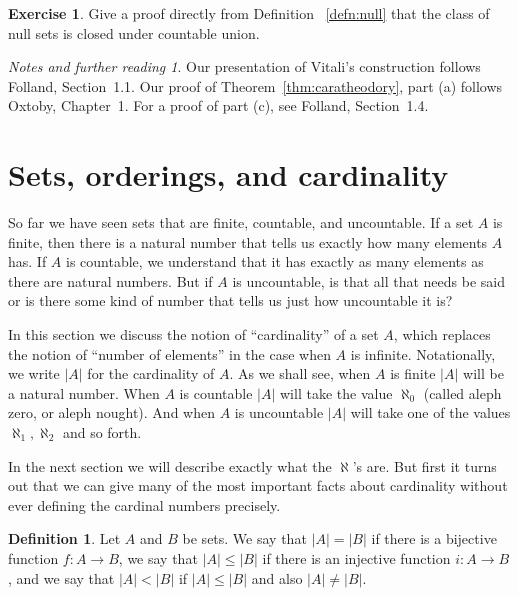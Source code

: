 \documentclass[11pt,oneside]{amsbook}
\theoremstyle{definition}
\newtheorem{exerc}{Exercise}[section]
\theoremstyle{plain}
\theoremstyle{definition}
\newtheorem{defn}[thm]{Definition}
\theoremstyle{remark}
\newtheorem*{notes}{Notes and further reading}
\begin{document}
\begin{exerc}
  Give a proof directly from Definition ~\ref{defn:null} that the class of null sets is closed under countable union.
\end{exerc}

\begin{notes}
  Our presentation of Vitali's construction follows Folland, Section~1.1. Our proof of Theorem~\ref{thm:caratheodory}, part (a) follows Oxtoby, Chapter~1. For a proof of part (c), see Folland, Section~1.4. 
\end{notes}


\section{Sets, orderings, and cardinality}

So far we have seen sets that are finite, countable, and uncountable. If a set $A$ is finite, then there is a natural number that tells us exactly how many elements $A$ has. If $A$ is countable, we understand that it has exactly as many elements as there are natural numbers. But if $A$ is uncountable, is that all that needs be said or is there some kind of number that tells us just how uncountable it is?

In this section we discuss the notion of ``cardinality'' of a set $A$, which replaces the notion of ``number of elements'' in the case when $A$ is infinite. Notationally, we write $|A|$ for the cardinality of $A$. As we shall see, when $A$ is finite $|A|$ will be a natural number. When $A$ is countable $|A|$ will take the value $\aleph_0$ (called aleph zero, or aleph nought). And when $A$ is uncountable $|A|$ will take one of the values $\aleph_1,\aleph_2$ and so forth.

In the next section we will describe exactly what the $\aleph$'s are. But first it turns out that we can give many of the most important facts about cardinality without ever defining the cardinal numbers precisely.

\begin{defn}
  \label{defn:cardinal-rel}
  Let $A$ and $B$ be sets. We say that $|A|=|B|$ if there is a bijective function $f\colon A\to B$, we say that $|A|\leq|B|$ if there is an injective function $i\colon A\to B$, and we say that $|A|<|B|$ if $|A|\leq|B|$ and also $|A|\neq|B|$.
\end{defn}
\end{document}
